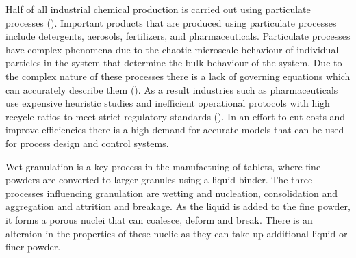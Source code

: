 \documentclass[preprint,11pt,authoryear]{elsarticle}
\begin{document}
\par Half of all industrial chemical production is carried out using particulate processes (\cite{seville1997}). Important products that are produced using particulate processes include detergents, aerosols, fertilizers, and pharmaceuticals. Particulate processes have complex phenomena due to the chaotic microscale behaviour of individual particles in the system that determine the bulk behaviour of the system. Due to the complex nature of these processes there is a lack of governing equations which can accurately describe them (\cite{sen2013}). As a result industries such as pharmaceuticals use expensive heuristic studies and inefficient operational protocols with high recycle ratios to meet strict regulatory standards (\cite{Ramachandran2009}). In an effort to cut costs and improve efficiencies there is a high demand for accurate models that can be used for process design and control systems.
\par Wet granulation is a key process in the manufactuing of tablets, where fine powders are converted to larger granules using a liquid binder. The three processes influencing granulation are wetting and nucleation, consolidation and aggregation and attrition and breakage\citep{Iveson2001}\citep{Cameron2005}. As the liquid is added to the fine powder, it forms a porous nuclei that can coalesce, deform and break\citep{Barrasso2015ces}. There is an alteraion in the properties of these nuclie as they can take up additional liquid or finer powder.
\end{document}
